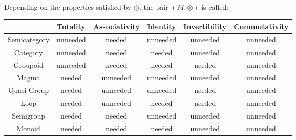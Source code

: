 \documentclass[a4paper,12pt]{scrartcl}    %
\newcommand{\OpA}{\otimes}
\begin{document}
\begin{landscape}
\begin{minipage}[t][]{0.30 \linewidth}
		
				\fbox{
		  \parbox{\textwidth}{
				\emph{Total} 
				\begin{displaymath}
				\ran(\OpA)\subset M \textrm{i.e.} 	( x \OpA y ) \in M \qquad \forall x,y\in M
				\end{displaymath}
				\begin{equation}\label{Totality}
					\dom(\OpA) = M \times M
				\end{equation}
		  }
		}
		\vfill
	\end{minipage}
	\hspace{1cm}
	\begin{minipage}[t][]{0.60 \linewidth}
    	\begin{center}
    	Depending on the properties satisfied by $\OpA$, the pair $(M,\OpA)$ is called:
    	\begin{tabular}{|c|c|c|c|c|c|}
    		\hline
    		& Totality & Associativity & Identity & Invertibility & Commutativity \\
    		\hline
    		Semicategory & \cellcolor{red!25} unneeded & \cellcolor{green!25} needed &  \cellcolor{red!25} unneeded &  \cellcolor{red!25} unneeded &  \cellcolor{red!25} unneeded \\
    		Category & \cellcolor{red!25} unneeded & \cellcolor{green!25} needed &  \cellcolor{green!25} needed &  \cellcolor{red!25} unneeded &  \cellcolor{red!25} unneeded \\
    		Groupoid & \cellcolor{red!25} unneeded & \cellcolor{green!25} needed &  \cellcolor{green!25} needed &  \cellcolor{green!25} needed &  \cellcolor{red!25} unneeded \\
    		Magma & \cellcolor{green!25} needed & \cellcolor{red!25} unneeded &  \cellcolor{red!25} unneeded &  \cellcolor{red!25} unneeded &  \cellcolor{red!25} unneeded \\
    		\href{https://it.wikipedia.org/wiki/Quasigruppo}{Quasi-Group} & \cellcolor{green!25} needed & \cellcolor{red!25} unneeded &  \cellcolor{red!25} unneeded &  \cellcolor{green!25} needed &  \cellcolor{red!25} unneeded \\
    		Loop & \cellcolor{green!25} needed &\cellcolor{red!25} unneeded &  \cellcolor{green!25} needed &  \cellcolor{green!25} needed &  \cellcolor{red!25} unneeded \\
    		Semigroup & \cellcolor{green!25} needed & \cellcolor{green!25} needed &  \cellcolor{red!25} unneeded &  \cellcolor{red!25} unneeded &  \cellcolor{red!25} unneeded \\
    		Monoid & \cellcolor{green!25} needed & \cellcolor{green!25} needed &  \cellcolor{green!25} needed &  \cellcolor{red!25} unneeded &  \cellcolor{red!25} unneeded \\

\end{tabular}
\end{center}
\end{minipage}
\end{landscape}
\end{document}
